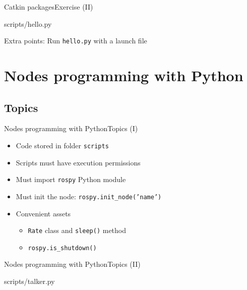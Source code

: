 \documentclass[10pt,compress]{beamer} %
\begin{document}
\begin{frame}[fragile]{Catkin packages}{Exercise (II)}
	\begin{block}{scripts/hello.py}
        
	\end{block}
	Extra points: Run \texttt{hello.py} with a launch file
\end{frame}

\section{Nodes programming with Python}

\subsection{Topics}
\begin{frame}[fragile]{Nodes programming with Python}{Topics (I)}
	\begin{itemize}
		\item Code stored in folder \texttt{scripts}
		\item Scripts must have execution permissions
		\item Must import \texttt{rospy} Python module
		\item Must init the node: \texttt{rospy.init\_node('name')}
		\item Convenient assets
			\begin{itemize}
			\item \texttt{Rate} class and \texttt{sleep()} method
			\item \texttt{rospy.is\_shutdown()}
			\end{itemize}
	\end{itemize}
\end{frame}

\begin{frame}{Nodes programming with Python}{Topics (II)}
    \vspace{-0.2cm}
	\begin{block}{scripts/talker.py}
    \vspace{-0.2cm}
        
    \vspace{-0.2cm}
	\end{block}
\end{frame}
\end{document}
